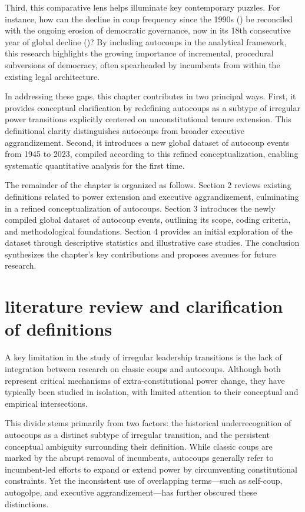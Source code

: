 \documentclass[
  12pt,
]{report}
\begin{document}
Third, this comparative lens helps illuminate key contemporary puzzles.
For instance, how can the decline in coup frequency since the 1990s
() be reconciled with the ongoing
erosion of democratic governance, now in its 18th consecutive year of
global decline ()? By including autocoups in the analytical framework, this
research highlights the growing importance of incremental, procedural
subversions of democracy, often spearheaded by incumbents from within
the existing legal architecture.

In addressing these gaps, this chapter contributes in two principal
ways. First, it provides conceptual clarification by redefining
autocoups as a subtype of irregular power transitions explicitly
centered on unconstitutional tenure extension. This definitional clarity
distinguishes autocoups from broader executive aggrandizement. Second,
it introduces a new global dataset of autocoup events from 1945 to 2023,
compiled according to this refined conceptualization, enabling
systematic quantitative analysis for the first time.

The remainder of the chapter is organized as follows. Section 2 reviews
existing definitions related to power extension and executive
aggrandizement, culminating in a refined conceptualization of autocoups.
Section 3 introduces the newly compiled global dataset of autocoup
events, outlining its scope, coding criteria, and methodological
foundations. Section 4 provides an initial exploration of the dataset
through descriptive statistics and illustrative case studies. The
conclusion synthesizes the chapter's key contributions and proposes
avenues for future research.

\section{literature review and clarification of
definitions}\label{literature-review-and-clarification-of-definitions}

A key limitation in the study of irregular leadership transitions is the
lack of integration between research on classic coups and autocoups.
Although both represent critical mechanisms of extra-constitutional
power change, they have typically been studied in isolation, with
limited attention to their conceptual and empirical intersections.

This divide stems primarily from two factors: the historical
underrecognition of autocoups as a distinct subtype of irregular
transition, and the persistent conceptual ambiguity surrounding their
definition. While classic coups are marked by the abrupt removal of
incumbents, autocoups generally refer to incumbent-led efforts to expand
or extend power by circumventing constitutional constraints. Yet the
inconsistent use of overlapping terms---such as self-coup, autogolpe,
and executive aggrandizement---has further obscured these distinctions.
\end{document}
